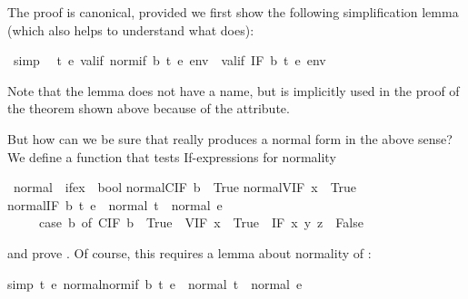 \begin{isabelle}
\begin{isamarkuptext}%
\noindent
The proof is canonical, provided we first show the following simplification
lemma (which also helps to understand what  does):%
\end{isamarkuptext}%
\ {\isacharbrackleft}simp{\isacharbrackright}{\isacharcolon}\isanewline
\ \ {\isachardoublequote}{\isasymforall}t\ e{\isachardot}\ valif\ {\isacharparenleft}normif\ b\ t\ e{\isacharparenright}\ env\ {\isacharequal}\ valif\ {\isacharparenleft}IF\ b\ t\ e{\isacharparenright}\ env{\isachardoublequote}%
\begin{isamarkuptext}%
\noindent
Note that the lemma does not have a name, but is implicitly used in the proof
of the theorem shown above because of the \isa{[simp]} attribute.

But how can we be sure that  really produces a normal form in
the above sense? We define a function that tests If-expressions for normality%
\end{isamarkuptext}%
\ normal\ {\isacharcolon}{\isacharcolon}\ {\isachardoublequote}ifex\ {\isasymRightarrow}\ bool{\isachardoublequote}\isanewline
{}\isanewline
{\isachardoublequote}normal{\isacharparenleft}CIF\ b{\isacharparenright}\ {\isacharequal}\ True{\isachardoublequote}\isanewline
{\isachardoublequote}normal{\isacharparenleft}VIF\ x{\isacharparenright}\ {\isacharequal}\ True{\isachardoublequote}\isanewline
{\isachardoublequote}normal{\isacharparenleft}IF\ b\ t\ e{\isacharparenright}\ {\isacharequal}\ {\isacharparenleft}normal\ t\ {\isasymand}\ normal\ e\ {\isasymand}\isanewline
\ \ \ \ \ {\isacharparenleft}case\ b\ of\ CIF\ b\ {\isasymRightarrow}\ True\ {\isacharbar}\ VIF\ x\ {\isasymRightarrow}\ True\ {\isacharbar}\ IF\ x\ y\ z\ {\isasymRightarrow}\ False{\isacharparenright}{\isacharparenright}{\isachardoublequote}%
\begin{isamarkuptext}%
\noindent
and prove . Of course, this requires a lemma about
normality of :%
\end{isamarkuptext}%
simp{\isacharbrackright}{\isacharcolon}\ {\isachardoublequote}{\isasymforall}t\ e{\isachardot}\ normal{\isacharparenleft}normif\ b\ t\ e{\isacharparenright}\ {\isacharequal}\ {\isacharparenleft}normal\ t\ {\isasymand}\ normal\ e{\isacharparenright}{\isachardoublequote}\end{isabelle}%
